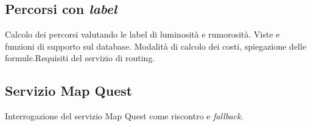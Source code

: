 \subsection{Percorsi con \emph{label}}
Calcolo dei percorsi valutando le label di luminosità e rumorosità. 
Viste e funzioni di supporto sul database. 
Modalità di calcolo dei costi, spiegazione delle formule.Requisiti del servizio di routing. 
\subsection{Servizio Map Quest}
Interrogazione del servizio Map Quest come riscontro e \emph{fallback}. 